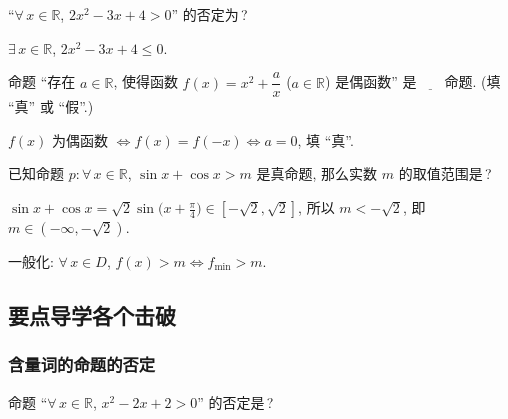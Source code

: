   \begin{exercise}
    ``$\forall\, x\in \mathbb{R}$, $2x^2-3x+4>0$'' 的否定为\,?
  \end{exercise}

  \beginsolution
    $\exists\, x\in \mathbb{R}$, $2x^2-3x+4\leqslant 0$.
  \endsolution
  
  \begin{exercise}
    命题 ``存在 $a\in \mathbb{R}$, 
    使得函数 $f(x)=x^2 +\dfrac{a}{x}$ ($a\in \mathbb{R}$) 是偶函数'' 
    是$\underline{\qquad}$命题. (填 ``真'' 或 ``假''.)
  \end{exercise}

  \beginsolution
    $f(x)$ 为偶函数 $\Leftrightarrow f(x)=f(-x)\Leftrightarrow a=0$, 填 ``真''.
  \endsolution
  
  \begin{exercise}
    已知命题 $p\colon \forall\, x\in \mathbb{R}$, $\sin x+\cos x>m$ 是真命题,
    那么实数 $m$ 的取值范围是\,?
  \end{exercise}

  \beginsolution
    $\sin x+\cos x= \sqrt2\sin\Big(x+\frac\pi4\Big)\in [-\sqrt2,\sqrt2]$, 
    所以 $m<-\sqrt2$, 即 $m\in(-\infty,-\sqrt2)$.
    
    一般化: $\forall\, x\in D$, $f(x)>m\Leftrightarrow f_{\min}>m$.
  \endsolution
  
  \subsection{要点导学\quad 各个击破}
  \subsubsection{含量词的命题的否定}
  \begin{example}
    命题 ``$\forall\, x\in \mathbb{R}$, $x^2-2x+2>0$'' 的否定是\,?
  \end{example}


